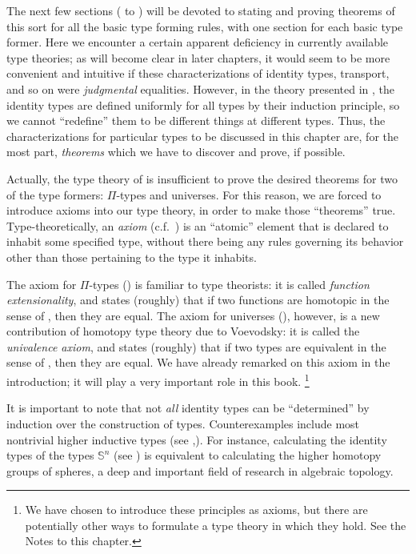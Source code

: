 \documentclass[12pt]{article}
\newcommand{\indexsee}[2]{\index{#1|see{#2}}}
\newcommand{\Sn}{\mathbb{S}}
\begin{document}
The next few sections ( to ) will be devoted to stating and proving theorems of this sort for all the basic type forming rules, with one section for each basic type former.
Here we encounter a certain apparent deficiency in currently available type theories;
as will become clear in later chapters, it would seem to be more convenient and intuitive if these characterizations of identity types, transport, and so on were \emph{judgmental} equalities.
However, in the theory presented in , the identity types are defined uniformly for all types by their induction principle, so we cannot ``redefine'' them to be different things at different types.
Thus, the characterizations for particular types to be discussed in this chapter are, for the most part, \emph{theorems} which we have to discover and prove, if possible.

Actually, the type theory of  is insufficient to prove the desired theorems for two of the type formers: $\Pi$-types and universes.
For this reason, we are forced to introduce axioms into our type theory, in order to make those ``theorems'' true.
Type-theoretically, an \emph{axiom} (c.f.~) is an ``atomic'' element that is declared to inhabit some specified type, without there being any rules governing its behavior other than those pertaining to the type it inhabits.
%

%
\indexsee{extensionality, of functions}{function extensionality}
%
The axiom for $\Pi$-types () is familiar to type theorists: it is called \emph{function extensionality}, and states (roughly) that if two functions are homotopic in the sense of , then they are equal.
The axiom for universes (), however, is a new contribution of homotopy type theory due to Voevodsky: it is called the \emph{univalence axiom}, and states (roughly) that if two types are equivalent in the sense of , then they are equal.
We have already remarked on this axiom in the introduction; it will play a very important role in this book.%
\footnote{We have chosen to introduce these principles as axioms, but there are potentially other ways to formulate a type theory in which they hold.
  See the Notes to this chapter.}

It is important to note that not \emph{all} identity types can be ``determined'' by induction over the construction of types.
Counterexamples include most nontrivial higher inductive types (see ,).
For instance, calculating the identity types of the types $\Sn^n$ (see ) is equivalent to calculating the higher homotopy groups of spheres, a deep and important field of research in algebraic topology.
\end{document}
